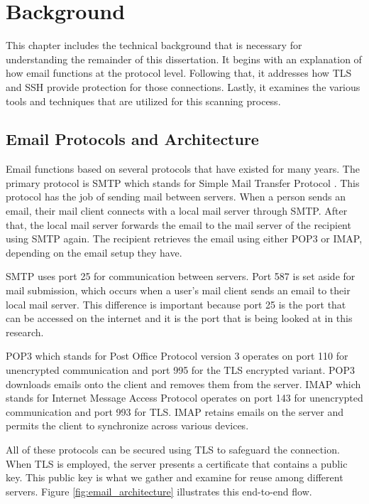 \chapter{Background}

This chapter includes the technical background that is necessary for understanding the remainder of this dissertation. It begins with an explanation of how email functions at the protocol level. Following that, it addresses how TLS and SSH provide protection for those connections. Lastly, it examines the various tools and techniques that are utilized for this scanning process.

\section{Email Protocols and Architecture}

Email functions based on several protocols that have existed for many years. The primary protocol is SMTP which stands for Simple Mail Transfer Protocol \cite{rfc5321}. This protocol has the job of sending mail between servers. When a person sends an email, their mail client connects with a local mail server through SMTP. After that, the local mail server forwards the email to the mail server of the recipient using SMTP again. The recipient retrieves the email using either POP3 or IMAP, depending on the email setup they have.

SMTP uses port 25 for communication between servers. Port 587 is set aside for mail submission, which occurs when a user's mail client sends an email to their local mail server. This difference is important because port 25 is the port that can be accessed on the internet and it is the port that is being looked at in this research.

POP3 which stands for Post Office Protocol version 3 operates on port 110 for unencrypted communication and port 995 for the TLS encrypted variant. POP3 downloads emails onto the client and removes them from the server. IMAP which stands for Internet Message Access Protocol operates on port 143 for unencrypted communication and port 993 for TLS. IMAP retains emails on the server and permits the client to synchronize across various devices.

All of these protocols can be secured using TLS to safeguard the connection. When TLS is employed, the server presents a certificate that contains a public key. This public key is what we gather and examine for reuse among different servers. Figure \ref{fig:email_architecture} illustrates this end-to-end flow.

